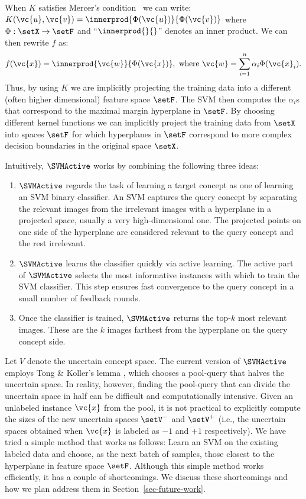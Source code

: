 When $K$ satisfies Mercer's condition~\cite{Burges:1998} we can write:
$K(\vc{u}, \vc{v}) = \innerprod{\Phi(\vc{u})}{\Phi(\vc{v})}$ where
$\Phi:\setX \rightarrow \setF$ and ``$\innerprod{}{}$'' denotes an
inner product. We can then rewrite $f$ as:
\begin{equation}
f(\vc{x}) = \innerprod{\vc{w}}{\Phi(\vc{x})}, 
\mbox{ where } \vc{w} = \sum_{i=1}^n \alpha_i \Phi(\vc{x}_i).
\label{eq:kernel_hyperplane}
\end{equation}
Thus, by using $K$ we are implicitly projecting the training data
into a different (often higher dimensional) feature space $\setF$.
The SVM then computes the $\alpha_i$s that correspond to the maximal
margin hyperplane in $\setF$.  By choosing different kernel functions
we can implicitly project the training data from $\setX$ into spaces
$\setF$ for which hyperplanes in $\setF$ correspond to more complex
decision boundaries in the original space $\setX$. 

Intuitively, $\SVMActive$ works by combining the following three ideas:
\begin{enumerate}
\item $\SVMActive$ regards the task of learning a target concept as
one of learning an SVM binary classifier.  An SVM captures the query
concept by separating the relevant images from the irrelevant images
with a hyperplane in a projected space, usually a very
high-dimensional one.  The projected points on one side of the
hyperplane are considered relevant to the query concept and the rest
irrelevant.
\item $\SVMActive$ learns the classifier quickly
via active learning.
The active part of $\SVMActive$ selects the most informative instances
with which to train the SVM classifier. This step ensures fast convergence
to the query concept in a small number of feedback rounds.
\item Once the classifier is trained, $\SVMActive$ returns the top-$k$
most relevant images. These are the $k$ images farthest
from the hyperplane on the query concept side.
\end{enumerate}

Let $V$ denote the uncertain concept space.
The current version of $\SVMActive$ employs
Tong \& Koller's lemma \cite{TK00-b}, which chooses a pool-query
that halves the uncertain space.  
In reality, however, finding the pool-query that
can divide the uncertain space in half can
be difficult and computationally intensive.
Given an unlabeled instance $\vc{x}$ from the pool,
it is not practical to explicitly compute the sizes of the new uncertain
spaces $\setV^{-}$ and $\setV^{+}$ (i.e., the uncertain spaces obtained
when $\vc{x}$ is labeled as $-1$ and $+1$ respectively).  
We have tried a simple method that works as follows:
Learn an SVM on the existing labeled data and choose, as the next
batch of samples, those closest to the 
hyperplane in feature space $\setF$.
Although this simple method works efficiently, 
it has a couple of shortcomings. We discuss 
these shortcomings and how we plan
address them in Section~\ref{sec-future-work}.

